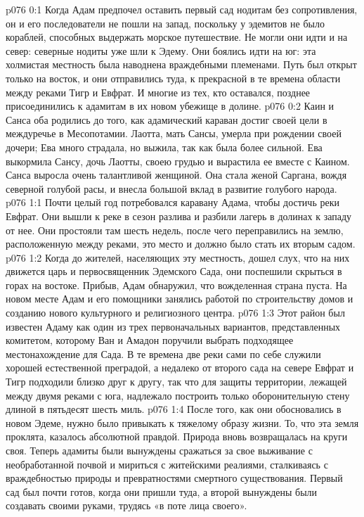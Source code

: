 \author{Солония}
\vs p076 0:1 Когда Адам предпочел оставить первый сад нодитам без сопротивления, он и его последователи не пошли на запад, поскольку у эдемитов не было кораблей, способных выдержать морское путешествие. Не могли они идти и на север: северные нодиты уже шли к Эдему. Они боялись идти на юг: эта холмистая местность была наводнена враждебными племенами. Путь был открыт только на восток, и они отправились туда, к прекрасной в те времена области между реками Тигр и Евфрат. И многие из тех, кто оставался, позднее присоединились к адамитам в их новом убежище в долине.
\vs p076 0:2 \pc Каин и Санса оба родились до того, как адамический караван достиг своей цели в междуречье в Месопотамии. Лаотта, мать Сансы, умерла при рождении своей дочери; Ева много страдала, но выжила, так как была более сильной. Ева выкормила Сансу, дочь Лаотты, своею грудью и вырастила ее вместе с Каином. Санса выросла очень талантливой женщиной. Она стала женой Саргана, вождя северной голубой расы, и внесла большой вклад в развитие голубого народа.
\vs p076 1:1 Почти целый год потребовался каравану Адама, чтобы достичь реки Евфрат. Они вышли к реке в сезон разлива и разбили лагерь в долинах к западу от нее. Они простояли там шесть недель, после чего переправились на землю, расположенную между реками, это место и должно было стать их вторым садом.
\vs p076 1:2 Когда до жителей, населяющих эту местность, дошел слух, что на них движется царь и первосвященник Эдемского Сада, они поспешили скрыться в горах на востоке. Прибыв, Адам обнаружил, что вожделенная страна пуста. На новом месте Адам и его помощники занялись работой по строительству домов и созданию нового культурного и религиозного центра.
\vs p076 1:3 Этот район был известен Адаму как один из трех первоначальных вариантов, представленных комитетом, которому Ван и Амадон поручили выбрать подходящее местонахождение для Сада. В те времена две реки сами по себе служили хорошей естественной преградой, а недалеко от второго сада на севере Евфрат и Тигр подходили близко друг к другу, так что для защиты территории, лежащей между двумя реками с юга, надлежало построить только оборонительную стену длиной в пятьдесят шесть миль.
\vs p076 1:4 \pc После того, как они обосновались в новом Эдеме, нужно было привыкать к тяжелому образу жизни. То, что эта земля проклята, казалось абсолютной правдой. Природа вновь возвращалась на круги своя. Теперь адамиты были вынуждены сражаться за свое выживание с необработанной почвой и мириться с житейскими реалиями, сталкиваясь с враждебностью природы и превратностями смертного существования. Первый сад был почти готов, когда они пришли туда, а второй вынуждены были создавать своими руками, трудясь «в поте лица своего».

